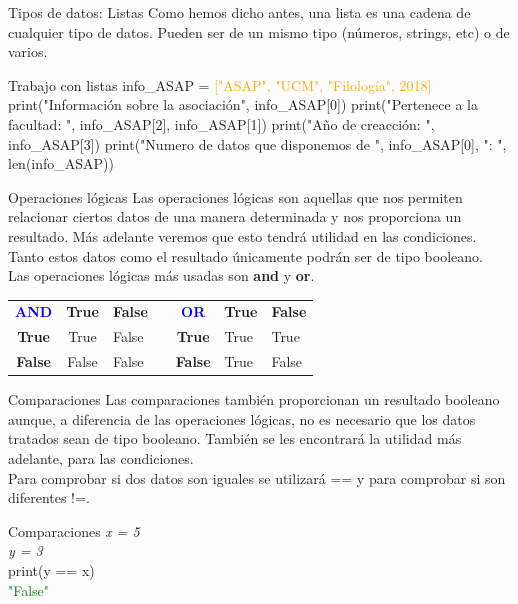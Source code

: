 \documentclass{beamer}
\begin{document}
\begin{frame}{Tipos de datos: Listas}
\label{datos:listas}
Como hemos dicho antes, una lista es una cadena de cualquier tipo de datos. Pueden ser de un mismo tipo (números, strings, etc) o de varios.
\begin{Programexample}{Trabajo con listas}
info\_ASAP = \textcolor{orange}{["ASAP", "UCM", "Filología", 2018]}
\newline\newline
print("Información sobre la asociación",  info\_ASAP[0])\newline
print("Pertenece a la facultad: ", info\_ASAP[2], info\_ASAP[1]) \newline
print("Año de creacción: ", info\_ASAP[3])\newline
print("Numero de datos que disponemos de ", info\_ASAP[0], ": ", len(info\_ASAP))
\end{Programexample}
\end{frame}

\begin{frame}{Operaciones lógicas}
Las operaciones lógicas son aquellas que nos permiten relacionar ciertos datos de una manera determinada y nos proporciona un resultado. Más adelante veremos que esto tendrá utilidad en las condiciones.\\
Tanto estos datos como el resultado únicamente podrán ser de tipo booleano.\\
Las operaciones lógicas más usadas son \textbf{and} y \textbf{or}.
\begin{table}[]
\begin{tabular}{|c|c|l|l|c|l|l|}
\cline{1-3} \cline{5-7}
\textcolor{blue}{\textbf{AND}}   & \textbf{True}  & \textbf{False} &  & \textcolor{blue}{\textbf{OR}}    & \textbf{True} & \textbf{False} \\ \cline{1-3} \cline{5-7} 
\textbf{True}  & True  & False &  & \textbf{True}  & True & True  \\ \cline{1-3} \cline{5-7} 
\textbf{False} & False & False &  & \textbf{False} & True & False \\ \cline{1-3} \cline{5-7} 
\end{tabular}
\end{table}
\end{frame}

\begin{frame}{Comparaciones}
Las comparaciones también proporcionan un resultado booleano aunque, a diferencia de las operaciones lógicas, no es necesario que los datos tratados sean de tipo booleano. También se les encontrará la utilidad más adelante, para las condiciones.\\
Para comprobar si dos datos son iguales se utilizará == y para comprobar si son diferentes !=.
\begin{Programexample} {Comparaciones}
\centering
\textit{x = 5}\\
\textit{y = 3}\\
print(y == x)\\
\textcolor{green}{"False"}
\end{Programexample}
\end{frame}
\end{document}
